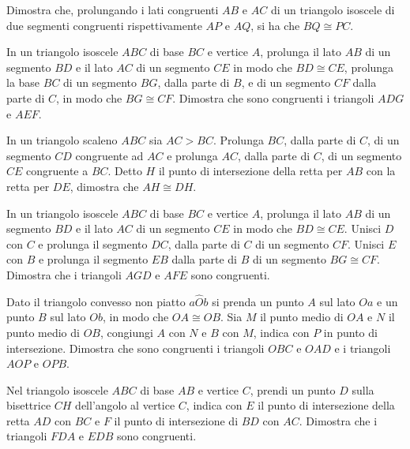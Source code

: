\begin{multicols}{2}
\begin{esercizio}
\label{ese:2.63}
Dimostra che, prolungando i lati congruenti $AB$ e $AC$ di un triangolo isoscele di due segmenti congruenti rispettivamente $AP$ e $AQ$, si ha che $BQ\cong PC$.
\end{esercizio}

\begin{esercizio}
\label{ese:2.64}
In un triangolo isoscele $ABC$ di base $BC$ e vertice $A$, prolunga il lato $AB$ di un segmento $BD$ e il lato $AC$ di un segmento $CE$ in modo che $BD\cong CE$, prolunga la base $BC$ di un segmento $BG$, dalla parte di $B$, e di un segmento $CF$ dalla parte di $C$, in modo che $BG\cong CF$. Dimostra che sono congruenti i triangoli $ADG$ e $AEF$.
\end{esercizio}

\begin{esercizio}
\label{ese:2.65}
In un triangolo scaleno $ABC$ sia $AC>BC$. Prolunga $BC$, dalla parte di $C$, di un segmento $CD$ congruente ad $AC$ e prolunga $AC$, dalla parte di $C$, di un segmento $CE$ congruente a $BC$. Detto $H$ il punto di intersezione della retta per $AB$ con la retta per $DE$, dimostra che $AH\cong DH$.
\end{esercizio}

\begin{esercizio}
\label{ese:2.66}
In un triangolo isoscele $ABC$ di base $BC$ e vertice $A$, prolunga il lato $AB$ di un segmento $BD$ e il lato $AC$ di un segmento $CE$ in modo che $BD\cong CE$. Unisci $D$ con $C$ e prolunga il segmento $DC$, dalla parte di $C$ di un segmento $CF$. Unisci $E$ con $B$ e prolunga il segmento $EB$ dalla parte di $B$ di un segmento $BG\cong CF$. Dimostra che i triangoli $AGD$ e $AFE$ sono congruenti.
\end{esercizio}

\begin{esercizio}
\label{ese:2.67}
Dato il triangolo convesso non piatto $a\widehat{O}b$ si prenda un punto $A$ sul lato $Oa$ e un punto $B$ sul lato $Ob$, in modo che $OA\cong OB$. Sia $M$ il punto medio di $OA$ e $N$ il punto medio di $OB$, congiungi $A$ con $N$ e $B$ con $M$, indica con $P$ in punto di intersezione. Dimostra che sono congruenti i triangoli $OBC$ e $OAD$ e i triangoli $AOP$ e $OPB$.
\end{esercizio}

\begin{esercizio}
\label{ese:2.68}
Nel triangolo isoscele $ABC$ di base $AB$ e vertice $C$, prendi un punto $D$ sulla bisettrice $CH$ dell'angolo al vertice $C$, indica con $E$ il punto di intersezione della retta $AD$ con $BC$ e $F$ il punto di intersezione di $BD$ con $AC$. Dimostra che i triangoli $FDA$ e $EDB$ sono congruenti.
\end{esercizio}


\end{multicols}
